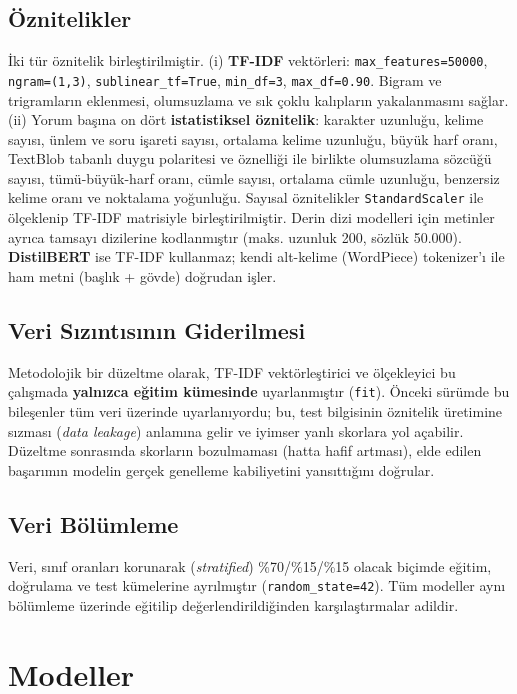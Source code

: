 \documentclass[conference]{IEEEtran}
\begin{document}
\subsection{Öznitelikler}
İki tür öznitelik birleştirilmiştir. (i) \textbf{TF-IDF} vektörleri:
\texttt{max\_features=50000}, \texttt{ngram=(1,3)}, \texttt{sublinear\_tf=True},
\texttt{min\_df=3}, \texttt{max\_df=0.90}. Bigram ve trigramların eklenmesi,
olumsuzlama ve sık çoklu kalıpların yakalanmasını sağlar. (ii) Yorum başına on dört
\textbf{istatistiksel öznitelik}: karakter uzunluğu, kelime sayısı, ünlem ve soru
işareti sayısı, ortalama kelime uzunluğu, büyük harf oranı, TextBlob tabanlı duygu
polaritesi ve öznelliği ile birlikte olumsuzlama sözcüğü sayısı, tümü-büyük-harf
oranı, cümle sayısı, ortalama cümle uzunluğu, benzersiz kelime oranı ve noktalama
yoğunluğu. Sayısal öznitelikler \texttt{StandardScaler} ile ölçeklenip TF-IDF
matrisiyle birleştirilmiştir. Derin dizi modelleri için metinler ayrıca tamsayı
dizilerine kodlanmıştır (maks. uzunluk 200, sözlük 50.000). \textbf{DistilBERT} ise
TF-IDF kullanmaz; kendi alt-kelime (WordPiece) tokenizer'ı ile ham metni (başlık +
gövde) doğrudan işler.

\subsection{Veri Sızıntısının Giderilmesi}
Metodolojik bir düzeltme olarak, TF-IDF vektörleştirici ve ölçekleyici bu
çalışmada \textbf{yalnızca eğitim kümesinde} uyarlanmıştır (\texttt{fit}).
Önceki sürümde bu bileşenler tüm veri üzerinde uyarlanıyordu; bu, test bilgisinin
öznitelik üretimine sızması (\emph{data leakage}) anlamına gelir ve iyimser yanlı
skorlara yol açabilir. Düzeltme sonrasında skorların bozulmaması (hatta hafif
artması), elde edilen başarımın modelin gerçek genelleme kabiliyetini yansıttığını
doğrular.

\subsection{Veri Bölümleme}
Veri, sınıf oranları korunarak (\emph{stratified}) \%70/\%15/\%15 olacak biçimde
eğitim, doğrulama ve test kümelerine ayrılmıştır (\texttt{random\_state=42}).
Tüm modeller aynı bölümleme üzerinde eğitilip değerlendirildiğinden
karşılaştırmalar adildir.

\section{Modeller}
\end{document}
